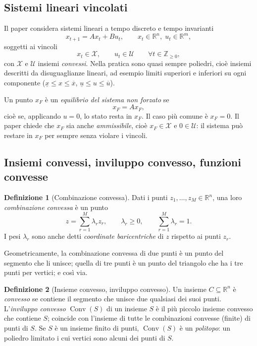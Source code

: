 \documentclass[11pt,a4paper]{article}
\theoremstyle{definition}
\newtheorem{definizione}{Definizione}[section]
\theoremstyle{plain}
\theoremstyle{remark}
\newcommand{\R}{\mathbb{R}}
\newcommand{\Zn}{\mathbb{Z}_{\ge 0}}
\newcommand{\Xc}{\mathcal{X}}
\newcommand{\Uc}{\mathcal{U}}
\DeclareMathOperator{\Conv}{Conv}
\begin{document}
\subsection{Sistemi lineari vincolati}\label{sec:sistemi}

Il paper considera sistemi lineari a tempo discreto e tempo invarianti
\begin{equation}\label{eq:sistema}
  x_{t+1} = A x_t + B u_t, \qquad x_t\in\R^n,\; u_t\in\R^m,
\end{equation}
soggetti ai vincoli
\begin{equation}\label{eq:vincoli}
  x_t\in\Xc,\qquad u_t\in\Uc\qquad \forall t\in\Zn,
\end{equation}
con $\Xc$ e $\Uc$ insiemi \emph{convessi}. Nella pratica sono quasi sempre
poliedri, cioè insiemi descritti da disuguaglianze lineari, ad esempio limiti
superiori e inferiori su ogni componente ($\underline{x}\le x\le\overline{x}$,
$\underline{u}\le u\le\overline{u}$).

Un punto $x_F$ è un \emph{equilibrio del sistema non forzato} se
\begin{equation}\label{eq:equilibrio}
  x_F = A x_F,
\end{equation}
cioè se, applicando $u=0$, lo stato resta in $x_F$. Il caso più comune è
$x_F=0$. Il paper chiede che $x_F$ sia anche \emph{ammissibile}, cioè
$x_F\in\Xc$ e $0\in\Uc$: il sistema può restare in $x_F$ per sempre senza
violare i vincoli.

\subsection{Insiemi convessi, inviluppo convesso, funzioni convesse}\label{sec:convessita}

\begin{definizione}[Combinazione convessa]
Dati i punti $z_1,\dots,z_M\in\R^n$, una loro \emph{combinazione convessa} è
un punto
\[
  z = \sum_{r=1}^{M}\lambda_r z_r,\qquad \lambda_r\ge 0,\qquad
  \sum_{r=1}^{M}\lambda_r = 1.
\]
I pesi $\lambda_r$ sono anche detti \emph{coordinate baricentriche} di $z$
rispetto ai punti $z_r$.
\end{definizione}

Geometricamente, la combinazione convessa di due punti è un punto del segmento
che li unisce; quella di tre punti è un punto del triangolo che ha i tre punti
per vertici; e così via.

\begin{definizione}[Insieme convesso, inviluppo convesso]
Un insieme $C\subseteq\R^n$ è \emph{convesso} se contiene il segmento che
unisce due qualsiasi dei suoi punti. L'\emph{inviluppo convesso}
$\Conv(S)$ di un insieme $S$ è il più piccolo insieme convesso che contiene
$S$; coincide con l'insieme di tutte le combinazioni convesse (finite) di
punti di $S$. Se $S$ è un insieme finito di punti, $\Conv(S)$ è un
\emph{politopo}: un poliedro limitato i cui vertici sono alcuni dei punti di
$S$.
\end{definizione}
\end{document}
